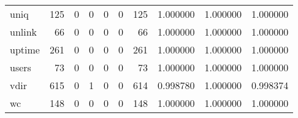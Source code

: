 \begin{longtable}{lrrrrrrrrr}
uniq      &                                   125 &                                                  0 &                                                  0 &                                                  0 &                                                  0 &                                                125 &                                           1.000000 &                               1.000000 &                             1.000000 \\
unlink    &                                    66 &                                                  0 &                                                  0 &                                                  0 &                                                  0 &                                                 66 &                                           1.000000 &                               1.000000 &                             1.000000 \\
uptime    &                                   261 &                                                  0 &                                                  0 &                                                  0 &                                                  0 &                                                261 &                                           1.000000 &                               1.000000 &                             1.000000 \\
users     &                                    73 &                                                  0 &                                                  0 &                                                  0 &                                                  0 &                                                 73 &                                           1.000000 &                               1.000000 &                             1.000000 \\
vdir      &                                   615 &                                                  0 &                                                  1 &                                                  0 &                                                  0 &                                                614 &                                           0.998780 &                               1.000000 &                             0.998374 \\
wc        &                                   148 &                                                  0 &                                                  0 &                                                  0 &                                                  0 &                                                148 &                                           1.000000 &                               1.000000 &                             1.000000 \\

\end{longtable}
